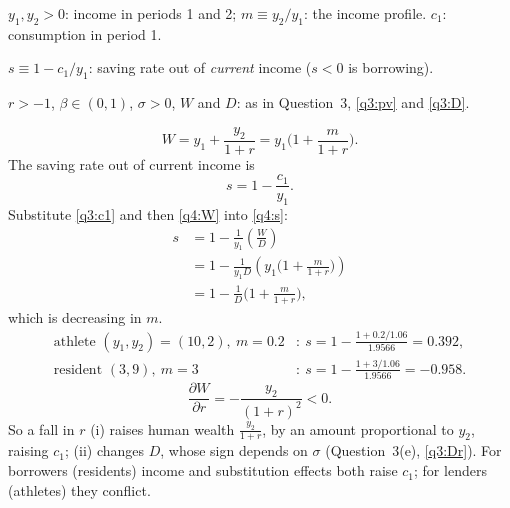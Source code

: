 \begin{sol}
\begin{notacao}
\item $y_1,y_2>0$: income in periods 1 and 2; $m\equiv y_2/y_1$: the income profile. $c_1$: consumption in period 1.
\item $s\equiv1-c_1/y_1$: saving rate out of \emph{current} income ($s<0$ is borrowing).
\item $r>-1$, $\beta\in(0,1)$, $\sigma>0$, $W$ and $D$: as in Question~3, \eqref{q3:pv} and \eqref{q3:D}.
\end{notacao}
\begin{equation}
W=y_1+\frac{y_2}{1+r}=y_1\Big(1+\frac{m}{1+r}\Big). \label{q4:W}
\end{equation}
The saving rate out of current income is
\begin{equation}
s=1-\frac{c_1}{y_1}. \label{q4:s}
\end{equation}
Substitute \eqref{q3:c1} and then \eqref{q4:W} into \eqref{q4:s}:
\begin{align}
s &= 1-\frac1{y_1}\left(\frac WD\right)\nonumber\\
&= 1-\frac1{y_1D}\left(y_1\Big(1+\frac{m}{1+r}\Big)\right)\nonumber\\
&= 1-\frac1D\Big(1+\frac{m}{1+r}\Big), \label{q4:sm}
\end{align}
which is decreasing in $m$.
\begin{align*}
\text{athlete } (y_1,y_2)=(10,2),\ m=0.2 &: \ s=1-\frac{1+0.2/1.06}{1.9566}=0.392,\\
\text{resident } (3,9),\ m=3 &: \ s=1-\frac{1+3/1.06}{1.9566}=-0.958.
\end{align*}
\[
\frac{\partial W}{\partial r}=-\frac{y_2}{(1+r)^2}<0 .
\]
So a fall in $r$ (i) raises human wealth $\frac{y_2}{1+r}$, by an amount proportional to $y_2$, raising $c_1$; (ii) changes $D$, whose
sign depends on $\sigma$ (Question~3(e), \eqref{q3:Dr}). For borrowers (residents) income and substitution effects both raise $c_1$;
for lenders (athletes) they conflict.
\end{sol}
